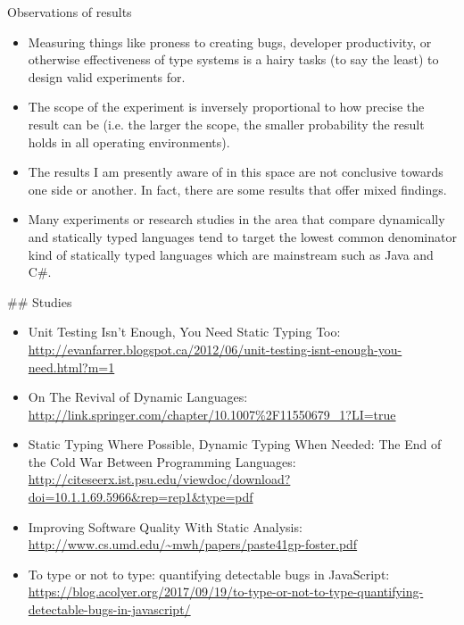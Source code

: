 \documentclass[presentation]{beamer}
\begin{document}
\begin{frame}[label={sec:org4398f0f}]{Observations of results}
\begin{itemize}
\item Measuring things like proness to creating bugs, developer
productivity, or otherwise effectiveness of type systems is a hairy
tasks (to say the least) to design valid experiments for.
\item The scope of the experiment is inversely proportional to how precise
the result can be (i.e. the larger the scope, the smaller
probability the result holds in all operating environments).
\item The results I am presently aware of in this space are not conclusive
towards one side or another. In fact, there are some results that
offer mixed findings.
\item Many experiments or research studies in the area that compare
dynamically and statically typed languages tend to target the lowest
common denominator kind of statically typed languages which are
mainstream such as Java and C\#.
\end{itemize}

\#\# Studies

\begin{itemize}
\item Unit Testing Isn't Enough, You Need Static Typing Too:
\url{http://evanfarrer.blogspot.ca/2012/06/unit-testing-isnt-enough-you-need.html?m=1}
\item On The Revival of Dynamic Languages:
\url{http://link.springer.com/chapter/10.1007\%2F11550679\_1?LI=true}
\item Static Typing Where Possible, Dynamic Typing When Needed: The End of
the Cold War Between Programming Languages:
\url{http://citeseerx.ist.psu.edu/viewdoc/download?doi=10.1.1.69.5966\&rep=rep1\&type=pdf}
\item Improving Software Quality With Static Analysis:
\url{http://www.cs.umd.edu/\~mwh/papers/paste41gp-foster.pdf}
\item To type or not to type: quantifying detectable bugs in JavaScript:
\url{https://blog.acolyer.org/2017/09/19/to-type-or-not-to-type-quantifying-detectable-bugs-in-javascript/}
\end{itemize}
\end{frame}
\end{document}
